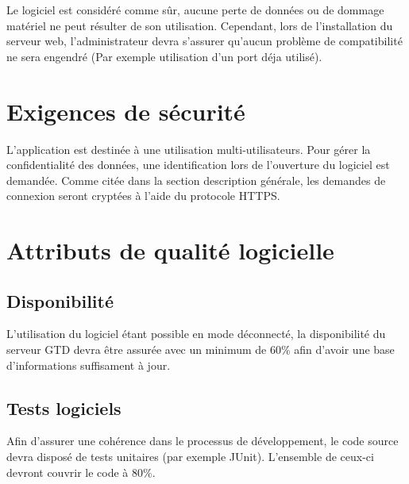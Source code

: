 Le logiciel est considéré comme sûr, aucune perte de données ou de dommage matériel ne peut résulter de son utilisation. Cependant, lors de l'installation du serveur web, l'administrateur devra s'assurer qu'aucun problème de compatibilité ne sera engendré (Par exemple utilisation d'un port déja utilisé). 

	\section{Exigences de sécurité}

	L'application est destinée à une utilisation multi-utilisateurs. Pour gérer la confidentialité des données, une identification lors de l'ouverture du logiciel est demandée. Comme citée dans la section description générale, les demandes de connexion seront cryptées à l'aide du protocole HTTPS.

	\section{Attributs de qualité logicielle}
	

	\subsection{Disponibilité}
	L'utilisation du logiciel étant possible en mode déconnecté, la disponibilité du serveur GTD devra être assurée avec un minimum de 60\% afin d'avoir une base d'informations suffisament à jour.
	
	\subsection{Tests logiciels}
	Afin d'assurer une cohérence dans le processus de développement, le code source devra disposé de tests unitaires (par exemple JUnit). L'ensemble de ceux-ci devront couvrir le code à 80\%.

